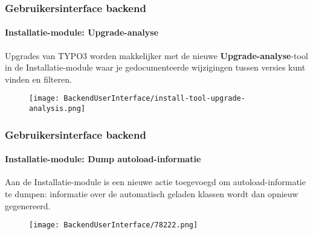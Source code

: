\begin{frame}[fragile]
	\frametitle{Gebruikersinterface backend}
	\framesubtitle{Installatie-module: Upgrade-analyse}


	Upgrades van TYPO3 worden makkelijker met de nieuwe \textbf{Upgrade-analyse}-tool
	in de Installatie-module waar je gedocumenteerde wijzigingen tussen versies kunt vinden en filteren.

	\begin{figure}
		\texttt{[image: BackendUserInterface/install-tool-upgrade-analysis.png]}
	\end{figure}

\end{frame}


\begin{frame}[fragile]
	\frametitle{Gebruikersinterface backend}
	\framesubtitle{Installatie-module: Dump autoload-informatie}

	Aan de Installatie-module is een nieuwe actie toegevoegd om autoload-informatie te dumpen:
	informatie over de automatisch geladen klassen wordt dan opnieuw gegenereerd.

	\begin{figure}
		\texttt{[image: BackendUserInterface/78222.png]}
	\end{figure}

\end{frame}



